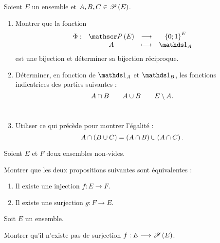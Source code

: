 \begin{exo}
Soient \(E\) un ensemble et \(A,B,C\in\P{E}\).

\begin{enumerate}
\item Montrer que la fonction \[\fonction{\Phi}{\P{E}}{\accol{0;1}^E}{A}{\ind{A}}\] est une bijection et déterminer sa bijection réciproque. \\

\item Déterminer, en fonction de \(\ind{A}\) et \(\ind{B}\), les fonctions indicatrices des parties suivantes : \[A\inter B\qquad A\union B\qquad E\excluant A.\] \\

\item Utiliser ce qui précède pour montrer l'égalité : \[A\inter\paren{B\union C}=\paren{A\inter B}\union\paren{A\inter C}.\]
\end{enumerate}
\end{exo}

\begin{corr}
\end{corr}

\begin{exo}[Exercice 12]
Soient \(E\) et \(F\) deux ensembles non-vides.

Montrer que les deux propositions suivantes sont équivalentes :

\begin{enumerate}
\item Il existe une injection \(f:E\to F\). \\

\item Il existe une surjection \(g:F\to E\).
\end{enumerate}
\end{exo}

\begin{corr}
\end{corr}

\begin{exo}[Exercice 13]
Soit \(E\) un ensemble.

Montrer qu'il n'existe pas de surjection \(f:E\to\P{E}\).
\end{exo}

\begin{corr}
\end{corr}

